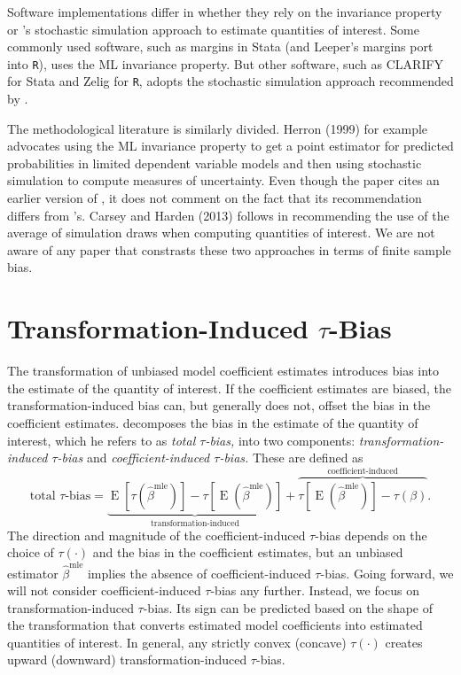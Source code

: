\documentclass[11pt]{article}
\DeclareMathOperator*{\E}{\text{E}}
\begin{document}
Software implementations differ in whether they rely on the invariance property or \cite{KingTomzWittenberg2000}'s stochastic simulation approach to estimate quantities of interest.
Some commonly used software, such as margins in Stata (and Leeper's margins port into \texttt{R}), uses the ML invariance property.
But other software, such as CLARIFY for Stata and Zelig for \texttt{R}, adopts the stochastic simulation approach recommended by \cite{KingTomzWittenberg2000}.

The methodological literature is similarly divided.
Herron (1999) for example advocates using the ML invariance property to get a point estimator for predicted probabilities in limited dependent variable models and then using stochastic simulation to compute measures of uncertainty.
Even though the paper cites an earlier version of \cite{KingTomzWittenberg2000}, it does not comment on the fact that its recommendation differs from \cite{KingTomzWittenberg2000}'s.
Carsey and Harden (2013) follows \cite{KingTomzWittenberg2000} in recommending the use of the average of simulation draws when computing quantities of interest.
We are not aware of any paper that constrasts these two approaches in terms of finite sample bias. 

\section*{Transformation-Induced $\tau$-Bias}

The transformation of unbiased model coefficient estimates introduces bias into the estimate of the quantity of interest.
If the coefficient estimates are biased, the transformation-induced bias can, but generally does not, offset the bias in the coefficient estimates.
\citet[p. 404]{Rainey2017} decomposes the bias in the estimate of the quantity of interest, which he refers to as {\it total $\tau$-bias,} into two components: {\it transformation-induced $\tau$-bias} and {\it coefficient-induced $\tau$-bias.} These are defined as
\begin{equation}
\text{total } \tau\text{-bias}= \underbrace{ \E[\tau(\hat{\beta}^\text{mle})]-  \tau[\E(\hat{\beta}^\text{mle})]  }_{\text{transformation-induced}} + \overbrace{  \tau[\E(\hat{\beta}^\text{mle})] - \tau(\beta)  }^{\text{coefficient-induced}}\text{.} \label{eqn:ti-bias}
\end{equation}
The direction and magnitude of the coefficient-induced $\tau$-bias depends on the choice of $\tau(\cdot)$ and the bias in the coefficient estimates, but an unbiased estimator $\hat{\beta}^\text{mle}$ implies the absence of coefficient-induced $\tau$-bias. 
Going forward, we will not consider coefficient-induced $\tau$-bias any further.
Instead, we focus on transformation-induced $\tau$-bias.
Its sign can be predicted based on the shape of the transformation that converts estimated model coefficients into estimated quantities of interest.
In general, any strictly convex (concave) $\tau(\cdot)$ creates upward (downward) transformation-induced $\tau$-bias.
\end{document}
